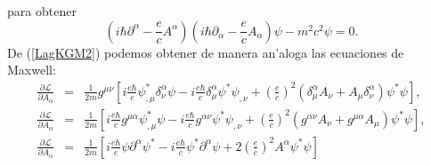 para obtener 
\begin{equation}
\left( i\hbar \partial ^{\alpha }-\frac{e}{c}A^{\alpha }\right) \left(
i\hbar \partial _{\alpha }-\frac{e}{c}A_{\alpha }\right) \psi
-m^{2}c^{2}\psi =0.
\end{equation}
De (\ref{LagKGM2}) podemos obtener de manera an'aloga las ecuaciones de
Maxwell: 
\begin{eqnarray*}
\frac{\partial \mathcal{L}}{\partial A_{\alpha }} &=&\frac{1}{2m}g^{\mu \nu }%
\left[ i\frac{e\hbar }{c}\psi _{,\mu }^{\ast }\delta _{\nu }^{\alpha }\psi
-i\frac{e\hbar }{c}\delta _{\mu }^{\alpha }\psi ^{\ast }\psi _{,\nu
}+\left( \frac{e}{c}\right) ^{2}\left( \delta _{\mu }^{\alpha }A_{\nu
}+A_{\mu }\delta _{\nu }^{\alpha }\right) \psi ^{\ast }\psi \right] , \\
\frac{\partial \mathcal{L}}{\partial A_{\alpha }} &=&\frac{1}{2m}\left[ i%
\frac{e\hbar }{c}g^{\mu \alpha }\psi _{,\mu }^{\ast }\psi -i\frac{e\hbar 
}{c}g^{\alpha \nu }\psi ^{\ast }\psi _{,\nu }+\left( \frac{e}{c}\right)
^{2}\left( g^{\alpha \nu }A_{\nu }+g^{\mu \alpha }A_{\mu }\right) \psi
^{\ast }\psi \right] , \\
\frac{\partial \mathcal{L}}{\partial A_{\alpha }} &=&\frac{1}{2m}\left[ i%
\frac{e\hbar }{c}\psi \partial ^{\alpha }\psi ^{\ast }-i\frac{e\hbar }{c}%
\psi ^{\ast }\partial ^{\alpha }\psi +2\left( \frac{e}{c}\right)
^{2}A^{\alpha }\psi ^{\ast }\psi \right]
\end{eqnarray*}
